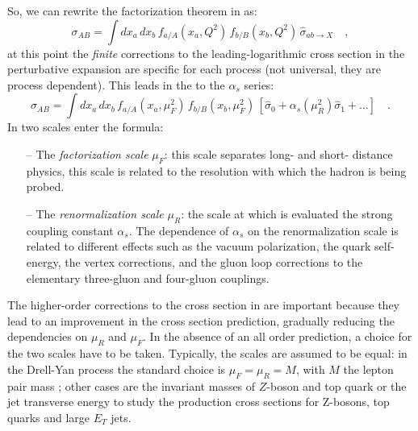So, we can rewrite the factorization theorem in  as:
\begin{equation}
	\sigma_{AB}=\displaystyle\int dx_a\,dx_b\,f_{a/A}(x_a,Q^2)\,f_{b/B}(x_b,Q^2)\,\hat{\sigma}_{ab \rightarrow X}\quad ,
\label{eq:factorization2}
\end{equation}
at this point the \emph{finite} corrections to the leading-logarithmic cross section in the perturbative expansion are specific for each process (not universal, they are process dependent). This leads in the  to the $\alpha_s$ series:
\begin{equation}
	\sigma_{AB}=\displaystyle\int dx_a\,dx_b\,f_{a/A}(x_a,\mu_F^2)\,f_{b/B}(x_b,\mu_F^2)\,\left[\hat{\sigma}_0+\alpha_s(\mu_R^2)\hat{\sigma}_1+\dots\right]\quad .
\label{eq:factorization3}
\end{equation}
In  two scales enter the formula:
\begin{itemize}
	\item[--] The \textit{factorization scale} $\mu_F$: this scale separates long- and short- distance physics, this scale is related to the resolution with which the hadron is being probed.
	\item[--] The \textit{renormalization scale} $\mu_R$: the scale at which is evaluated the strong coupling constant $\alpha_s$. The dependence of $\alpha_s$ on the renormalization scale is related to different effects such as  the vacuum polarization, the quark self-energy, the vertex corrections, and the gluon loop corrections to the elementary three-gluon and four-gluon couplings.
\end{itemize}

The higher-order corrections to the cross section in  are important because they lead to an improvement in the cross section prediction, gradually reducing the dependencies on $\mu_R$ and $\mu_F$. In the absence of an all order prediction, a choice for the two scales have to be taken.
Typically, the scales are assumed to be equal: in the Drell-Yan process the standard choice is $\mu_F=\mu_R=M$, with $M$ the lepton pair mass \cite{Campbell2006}; other cases are the invariant masses of $Z$-boson and top quark or the jet transverse energy to study \cite{Campbell2006} the production cross sections for Z-bosons, top quarks and large $E_T$ jets.

